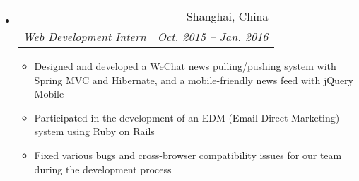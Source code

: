 \documentclass[letterpaper,11pt]{article}
\makeatletter
\newcommand{\resitem}[1]{\item #1 \vspace{-2pt}}
\newcommand{\ressubheading}[4]{
\begin{tabular*}{6.5in}{l@{\extracolsep{\fill}}r}
    \textbf{#1} & #2 \\
    \textit{#3} & \textit{#4} \\
\end{tabular*}\vspace{-6pt}}
\makeatother
\begin{document}
    \begin{itemize}
        \item
        \ressubheading
        {\href
        {http://www.vsc.com}
        {Venus Software Corporation}
        }
        {Shanghai, China}
        {Web Development Intern}
        {Oct. 2015 -- Jan. 2016}
        {\footnotesize
        \begin{itemize}
            \resitem{Designed and developed a WeChat news pulling/pushing system with Spring
            MVC and Hibernate, and a mobile-friendly news feed with jQuery Mobile}
            \resitem{Participated in the development of an EDM (Email Direct Marketing)
            system using Ruby on Rails}
            \resitem{Fixed various bugs and cross-browser compatibility issues for our team during
                     the development process}
        \end{itemize}
        }

    \end{itemize}
\end{document}
